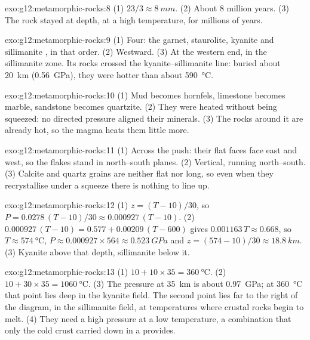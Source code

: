 \begin{solution}{exo:g12:metamorphic-rocks:8}
(1) $23/3 \approx \qty{8}{mm}$. (2) About 8 million years. (3) The rock
stayed at depth, at a high temperature, for millions of years.
\end{solution}

\begin{solution}{exo:g12:metamorphic-rocks:9}
(1) Four: the garnet, staurolite, kyanite and sillimanite , in that
order. (2) Westward. (3) At the western end, in the sillimanite zone. Its
rocks crossed the kyanite--sillimanite line: buried about \qty{20}{km}
(\qty{0.56}{GPa}), they were hotter than about \qty{590}{\celsius}.
\end{solution}

\begin{solution}{exo:g12:metamorphic-rocks:10}
(1) Mud becomes hornfels, limestone becomes marble, sandstone becomes
quartzite. (2) They were heated without being squeezed: no directed pressure
aligned their minerals. (3) The rocks around it are already hot, so the
magma heats them little more.
\end{solution}

\begin{solution}{exo:g12:metamorphic-rocks:11}
(1) Across the push: their flat faces face east and west, so the flakes
stand in north--south planes. (2) Vertical, running north--south.
(3) Calcite and quartz grains are neither flat nor long, so even when they
recrystallise under a squeeze there is nothing to line up.
\end{solution}

\begin{solution}{exo:g12:metamorphic-rocks:12}
(1) $z = (T - 10)/30$, so $P = 0.0278\,(T - 10)/30 \approx
0.000927\,(T - 10)$. (2) $0.000927\,(T - 10) = 0.577 + 0.00209\,(T - 600)$
gives $0.001163\,T \approx 0.668$, so $T \approx \qty{574}{\celsius}$, $P
\approx 0.000927 \times 564 \approx \qty{0.523}{GPa}$ and $z = (574 - 10)/30
\approx \qty{18.8}{km}$. (3) Kyanite above that depth, sillimanite below it.
\end{solution}

\begin{solution}{exo:g12:metamorphic-rocks:13}
(1) $10 + 10 \times 35 = \qty{360}{\celsius}$. (2) $10 + 30 \times 35 =
\qty{1060}{\celsius}$. (3) The pressure at \qty{35}{km} is about
\qty{0.97}{GPa}; at \qty{360}{\celsius} that point lies deep in the kyanite
field. The second point lies far to the right of the diagram, in the
sillimanite field, at temperatures where crustal rocks begin to melt.
(4) They need a high pressure at a low temperature, a combination that only
the cold crust carried down in a  provides.
\end{solution}

